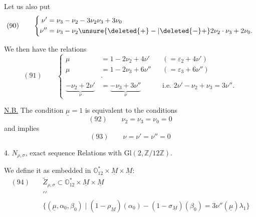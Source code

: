 
Let us also put
\[
(90)\qquad
\left\{\begin{aligned}
\nu'&=\nu_3-\nu_2-3\nu_2\nu_3+3\nu_0\\
\nu''&=\nu_3-\nu_2\unsure{\deleted{+}-|\deleted{-}+}2\nu_2\cdot\nu_3+2\nu_0.
\end{aligned}\right.
\]

We then have the relations
\[
(91)\qquad
\left\{\begin{aligned}
\mu&=1-2\nu_2+4\nu'&&({}=\varepsilon_2+4\nu')\\
\mu&=1-2\nu_3+6\nu''&&({}=\varepsilon_3+6\nu'')\\[6pt]
&\cdot\\[-3pt]
\underbrace{-\nu_2+2\nu'}_{\nu}&=
\underbrace{-\nu_3+3\nu''}_{\nu}
&&\text{i.e. }2\nu'-\nu_2+\nu_3=3\nu''.
\end{aligned}\right.
\]

\uline{N.B.} The condition $\underline\mu=1$ is equivalent to the conditions
\[
(92)\qquad \nu_2=\nu_3=\nu_0=0
\]
and implies
\[
(93)\qquad \nu=\nu'=\nu''=0
\]


4. 
$N_{\rho,\sigma}$, 
exact sequence
Relations with $\mathrm{Gl}(2,\mathbb Z/12\mathbb Z)$.

We define it as embedded in
$\mathbb O_{12}^{*}\times\underline M\times\underline M$:
\[
\begin{aligned}
(94)\quad&\widetilde Z_{\rho,\sigma}
\subset \mathbb O_{12}^{*}\times\underline M\times\underline M\\[-2pt]
&\prime\prime\\[-2pt]
&\bigl\{(\underline\mu,\alpha_0,\beta_0)\mid
(1-\rho_{\underline M})(\alpha_0)-(1-\sigma_{\underline M})(\beta_0)
=3\nu''(\underline\mu)\lambda_1\bigr\}
\end{aligned}
\]

